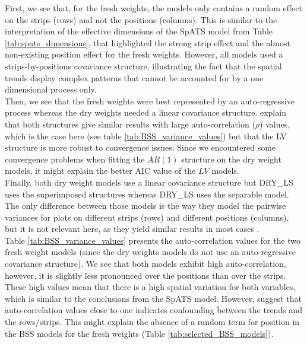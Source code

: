 First, we see that, for the fresh weights, the models only contains a random effect on the strips (rows) and not the positions (columns). This is similar to the interpretation of the effective dimensions of the SpATS model from Table \ref{tab:spats_dimensions}, that highlighted the strong strip effect and the almost non-existing position effect for the fresh weights. However, all models used a strips-by-positions covariance structure, illustrating the fact that the spatial trends display complex patterns that cannot be accounted for by a one dimensional process only. \\

Then, we see that the fresh weights were best represented by an auto-regressive process whereas the dry weights needed a linear covariance structure. \textcite{piepho_linear_2010} explain that both structures give similar results with large auto-correlation ($\rho$) values, which is the case here (see table \ref{tab:BSS_variance_values}) but that the LV structure is more robust to convergence issues. Since we encountered some convergence problems when fitting the $AR(1)$ structure on the dry weight models, it might explain the better AIC value of the $LV$ models.\\

Finally, both dry weight models use a linear covariance structure but DRY\_LS uses the superimposed structures whereas DRY\_LS uses the separable model. The only difference between those models is the way they model the pairwise variances for plots on different strips (rows) and different positions (columns), but it is not relevant here, as they yield similar results in most cases \parencite{piepho_linear_2010}.\\

Table \ref{tab:BSS_variance_values} presents the auto-correlation values for the two fresh weight models (since the dry weights models do not use an auto-regressive covariance structure). We see that both models exhibit high auto-correlation, however, it is slightly less pronounced over the positions than over the strips. These high values mean that there is a high spatial variation for both variables, which is similar to the conclusions from the SpATS model. However, \textcite{piepho_problems_2015} suggest that auto-correlation values close to one indicates confounding between the trends and the rows/strips. This might explain the absence of a random term for position in the BSS models for the fresh weights (Table \ref{tab:selected_BSS_models}).

